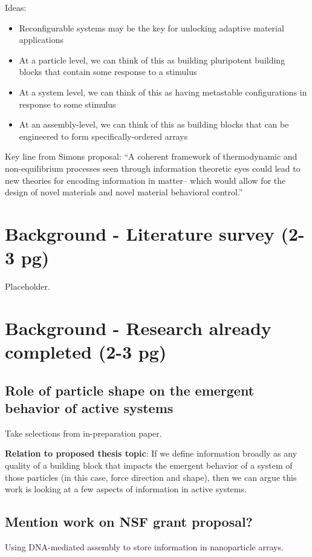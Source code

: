 \documentclass[12pt, oneside]{article}   	%
\begin{document}
Ideas:
\begin{itemize}
\item Reconfigurable systems may be the key for unlocking adaptive material applications
\item At a particle level, we can think of this as building pluripotent building blocks that contain some response to a stimulus
\item At a system level, we can think of this as having metastable configurations in response to some stimulus
\item At an assembly-level, we can think of this as building blocks that can be engineered to form specifically-ordered arrays
\end{itemize}


Key line from Simons proposal: ``A coherent framework of thermodynamic and non-equilibrium processes seen through information theoretic eyes could lead to new theories for encoding information in matter-- which would allow for the design of novel materials and novel material behavioral control.''

\section{Background - Literature survey (2-3 pg)}

Placeholder.

\section{Background - Research already completed (2-3 pg)}
\subsection{Role of particle shape on the emergent behavior of active systems}
Take selections from in-preparation paper.

\textbf{Relation to proposed thesis topic}: If we define information broadly as any quality of a building block that impacts the emergent behavior of a system of those particles (in this case, force direction and shape), then we can argue this work is looking at a few aspects of information in active systems.

\subsection{Mention work on NSF grant proposal?}
Using DNA-mediated assembly to store information in nanoparticle arrays. 
\end{document}
